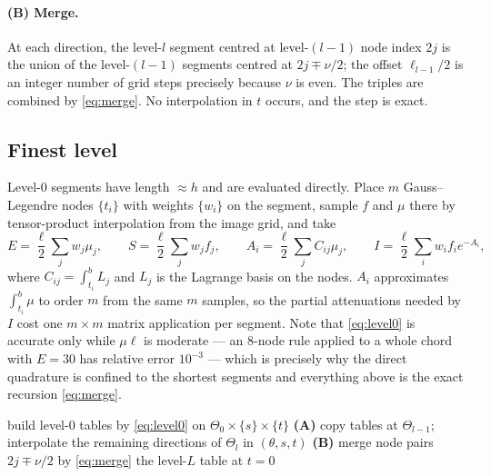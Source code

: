 \documentclass[11pt]{article}
\begin{document}
\paragraph{(B) Merge.}
At each direction, the level-$l$ segment centred at level-$(l-1)$ node index
$2j$ is the union of the level-$(l-1)$ segments centred at $2j\mp\nu/2$; the
offset $\ell_{l-1}/2$ is an integer number of grid steps precisely because
$\nu$ is even. The triples are combined by \eqref{eq:merge}. No interpolation
in $t$ occurs, and the step is exact.

\subsection{Finest level}

Level-0 segments have length $\approx h$ and are evaluated directly. Place $m$
Gauss--Legendre nodes $\{t_i\}$ with weights $\{w_i\}$ on the segment, sample
$f$ and $\mu$ there by tensor-product interpolation from the image grid, and
take
\begin{equation}
  E=\frac{\ell}{2}\sum_j w_j\mu_j,\qquad
  S=\frac{\ell}{2}\sum_j w_j f_j,\qquad
  A_i=\frac{\ell}{2}\sum_j C_{ij}\mu_j,\qquad
  I=\frac{\ell}{2}\sum_i w_i f_i e^{-A_i},
  \label{eq:level0}
\end{equation}
where $C_{ij}=\int_{t_i}^{b}L_j$ and $L_j$ is the Lagrange basis on the nodes.
$A_i$ approximates $\int_{t_i}^{b}\mu$ to order $m$ from the same $m$ samples,
so the partial attenuations needed by $I$ cost one $m\times m$ matrix
application per segment. Note that \eqref{eq:level0} is accurate only while
$\mu\ell$ is moderate --- an $8$-node rule applied to a whole chord with
$E=30$ has relative error $10^{-3}$ --- which is precisely why the direct
quadrature is confined to the shortest segments and everything above is the
exact recursion \eqref{eq:merge}.

\begin{algorithm}[t]
\caption{Multilevel evaluation of \eqref{eq:three}}
\label{alg:main}
\begin{algorithmic}[1]
\State build level-0 tables by \eqref{eq:level0} on $\Theta_0\times\{s\}\times\{t\}$
  \State \textbf{(A)} copy tables at $\Theta_{l-1}$; interpolate the remaining
         directions of $\Theta_l$ in $(\theta,s,t)$
  \State \textbf{(B)} merge node pairs $2j\mp\nu/2$ by \eqref{eq:merge}
\EndFor
\State \Return the level-$L$ table at $t=0$
\end{algorithmic}
\end{algorithm}
\end{document}
